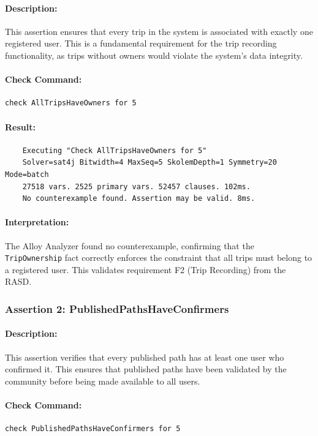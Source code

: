 \paragraph{Description:} This assertion ensures that every trip in the system is associated with exactly one registered user. This is a fundamental requirement for the trip recording functionality, as trips without owners would violate the system's data integrity.

\paragraph{Check Command:}
\begin{verbatim}
check AllTripsHaveOwners for 5
\end{verbatim}

\paragraph{Result:} 
\footnotesize
\begin{verbatim}
    Executing "Check AllTripsHaveOwners for 5"
    Solver=sat4j Bitwidth=4 MaxSeq=5 SkolemDepth=1 Symmetry=20 Mode=batch
    27518 vars. 2525 primary vars. 52457 clauses. 102ms.
    No counterexample found. Assertion may be valid. 8ms.
\end{verbatim}
\normalsize

\paragraph{Interpretation:} The Alloy Analyzer found no counterexample, confirming that the \texttt{TripOwnership} fact correctly enforces the constraint that all trips must belong to a registered user. This validates requirement F2 (Trip Recording) from the RASD.

\subsubsection{Assertion 2: PublishedPathsHaveConfirmers}
\paragraph{Description:} This assertion verifies that every published path has at least one user who confirmed it. This ensures that published paths have been validated by the community before being made available to all users.

\paragraph{Check Command:}
\begin{verbatim}
check PublishedPathsHaveConfirmers for 5
\end{verbatim}

